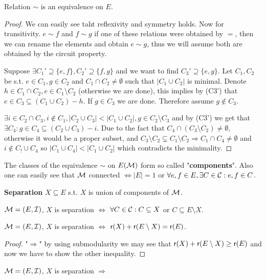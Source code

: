 \begin{prop}
	Relation $\sim$ is an equivalence on $E$.
\end{prop}

\begin{proof}
	We can easily see taht reflexivity and symmetry holds. Now for transitivity. $e \sim f$ and $f \sim g$ if one of these relations were obtained by $=$, then we can rename the elements and obtain $e \sim g$, thus we will assume both are obtained by the circuit property.

	Suppose $\exists C_1' \supseteq \{e,f\}, C_2' \supseteq \{f,g\}$ and we want to find $C_3' \supseteq \{e,g\}$. Let $C_1, C_2$ be s.t. $e \in C_1, g \in C_2$ and $C_1 \cap C_2 \neq \emptyset$ such that $|C_1 \cup C_2|$ is minimal. Denote $h \in C_1 \cap C_2, e \in C_1 \setminus C_2$ (otherwise we are done), this implies by (C3') that $e \in C_3 \subseteq (C_1 \cup C_2) - h$. If $g \in C_3$ we are done. Therefore assume $g \notin C_3$.

	$\exists i \in C_2 \cap C_3, i \notin C_1, |C_2 \cup C_3| < |C_1 \cup C_2|, g \in C_2 \setminus C_3$ and by (C3') we get that $\exists C_4 : g \in C_4 \subseteq (C_2 \cup C_3) - i$. Due to the fact that $C_4 \cap (C_3 \setminus C_2) \neq \emptyset$, otherwise it would be a proper subset, and $C_3 \setminus C_2 \subsetneq C_1 \setminus C_2 \Rightarrow C_1 \cap C_4 \neq \emptyset$ and $i \notin C_! \cup C_4$ so $|C_1 \cup C_4| < |C_1 \cup C_2|$ which contradicts the minimality.
\end{proof}

The classes of the equivalence $\sim$ on $E(\mathcal{M})$ form so called "\textbf{components}". Also one can easily see that $\mathcal{M}$ connected $\iff |E| = 1$ or $\forall e,f \in E, \exists C \in \mathcal{C} : e, f \in C$.

\begin{defn}
	\textbf{Separation} $X \subseteq E$ s.t. $X$ is union of components of $\mathcal{M}$.
\end{defn}

\begin{prop}
	$\mathcal{M} = (E, \mathcal{I})$, $X$ is separation $\iff$ $\forall C \in \mathcal{C} : C \subseteq X$ or $C \subseteq E \setminus X$.
\end{prop}

\begin{prop}
	$\mathcal{M} = (E, \mathcal{I})$, $X$ is separation $\iff$ $\operatorname{\textsf{r}}(X) + \operatorname{\textsf{r}}(E \setminus X) = \operatorname{\textsf{r}}(E)$.
\end{prop}

\begin{proof}
	"$\Rightarrow$" by using submodularity we may see that $\operatorname{\textsf{r}}(X) + \operatorname{\textsf{r}}(E \setminus X) \geq \operatorname{\textsf{r}}(E)$ and now we have to show the other inequality.
\end{proof}

\begin{prop}
	$\mathcal{M} = (E, \mathcal{I})$, $X$ is separation $\Rightarrow$
\end{prop}
